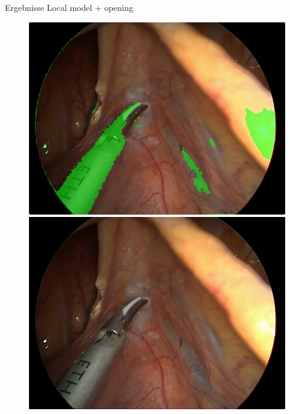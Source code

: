 \begin{frame}{Ergebnisse Local model + opening}
    \begin{figure}[ht]
        \begin{minipage}[b]{0.45\linewidth}
            \centering
            \includegraphics[width=\textwidth]{../images/model-303/img_02_raw-overlay.png}\\
            \includegraphics[width=\textwidth]{../images/op4-img_01.png}
        \end{minipage}
        \hspace{0.5cm}
        \begin{minipage}[b]{0.45\linewidth}
            \centering

\end{minipage}
\end{figure}
\end{frame}
